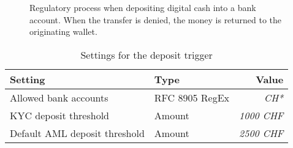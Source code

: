 \begin{figure}[h!]
\begin{center}
  \end{center}
  \caption{Regulatory process when depositing digital cash into a bank
    account.  When the transfer is denied, the money is returned to the
    originating wallet.}
\end{figure}


\begin{table}[h!]
  \caption{Settings for the deposit trigger}
  \begin{tabular}{l|l|r}
    {\bf Setting}                 & {\bf Type}         & {\bf Value}    \\ \hline \hline
    Allowed bank accounts         & RFC 8905 RegEx     & {\em CH*}      \\ \hline
    KYC deposit threshold         & Amount             & {\em 1000 CHF} \\
    Default AML deposit threshold & Amount             & {\em 2500 CHF} \\
  \end{tabular}
\end{table}
